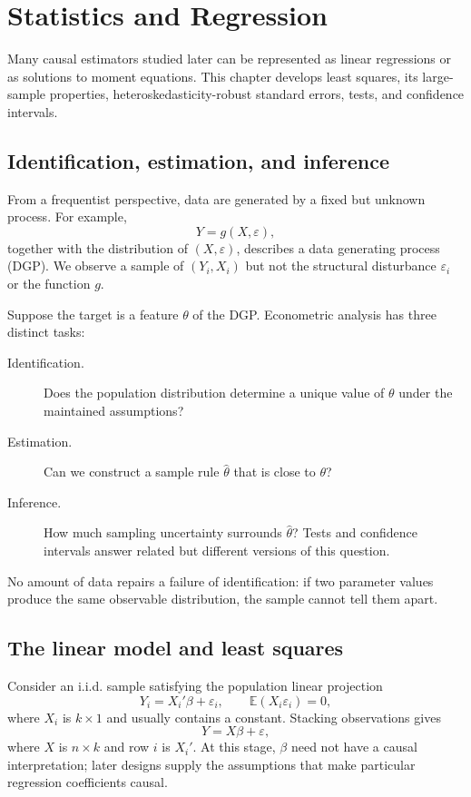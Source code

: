 \chapter{Statistics and Regression}
\label{ch:regression}

Many causal estimators studied later can be represented as linear regressions
or as solutions to moment equations.  This chapter develops least squares,
its large-sample properties, heteroskedasticity-robust standard errors, tests,
and confidence intervals.

\section{Identification, estimation, and inference}

From a frequentist perspective, data are generated by a fixed but unknown
process.  For example,
\[
  Y=g(X,\varepsilon),
\]
together with the distribution of $(X,\varepsilon)$, describes a data
generating process (DGP).  We observe a sample of $(Y_i,X_i)$ but not the
structural disturbance $\varepsilon_i$ or the function $g$.

Suppose the target is a feature $\theta$ of the DGP.  Econometric analysis has
three distinct tasks:
\begin{description}
  \item[Identification.] Does the population distribution determine a unique
        value of $\theta$ under the maintained assumptions?
  \item[Estimation.] Can we construct a sample rule $\widehat\theta$ that is
        close to $\theta$?
  \item[Inference.] How much sampling uncertainty surrounds
        $\widehat\theta$?  Tests and confidence intervals answer related but
        different versions of this question.
\end{description}
No amount of data repairs a failure of identification: if two parameter
values produce the same observable distribution, the sample cannot tell them
apart.

\section{The linear model and least squares}

Consider an i.i.d. sample satisfying the population linear projection
\begin{equation}
\label{eq:linear-model}
  Y_i=X_i'\beta+\varepsilon_i,
  \qquad \mathbb E(X_i\varepsilon_i)=0,
\end{equation}
where $X_i$ is $k\times1$ and usually contains a constant.  Stacking
observations gives
\[
  Y=X\beta+\varepsilon,
\]
where $X$ is $n\times k$ and row $i$ is $X_i'$.  At this stage, $\beta$ need
not have a causal interpretation; later designs supply the assumptions that
make particular regression coefficients causal.

